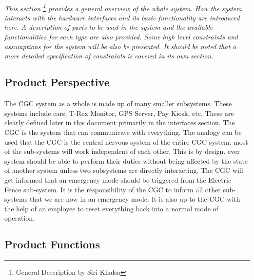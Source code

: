 \documentclass[12pt]{article}
\begin{document}
	\paragraph{}\textit{This section \footnote{General Description by Siri Khalsa} provides a general overview of the whole system. How the system interacts with 
	the hardware interfaces and its basic functionality are introduced here. A description of
	parts to be used in the system and the available functionalities for each type are also 
	provided. Some high level constraints and assumptions for the system will be also be presented.
	It should be noted that a more detailed specification of constraints is covered in its 
	own section.}
	
	\subsection{Product Perspective}
        \paragraph{} The CGC system as a whole is made up of many smaller subsystems. These systems include cars, T-Rex Monitor, GPS Server, Pay Kiosk, etc. These are clearly defined later
        in this document primarily in the interfaces section. The CGC is the system that can communicate with everything. The analogy can be used that the CGC is the central nervous system of the entire CGC system. most of the sub-systems will work independent of each other.
        This is by design. ever system should be able to perform their duties without being affected by the state of another system unless two subsystems are directly interacting.
        The CGC will get informed that an emergency mode should be triggered from the Electric Fence sub-system. It is the responsibility of the CGC to inform all other sub-systems that we are now in an emergency mode.
        It is also up to the CGC with the help of an employee to reset everything back into a normal mode of operation.

        \paragraph{} 
	\subsection{Product Functions}
\end{document}
